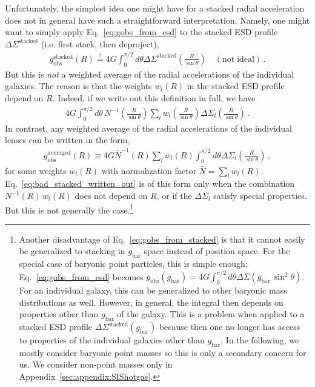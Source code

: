 \documentclass[a4paper,11pt]{article}
\begin{document}
Unfortunately, the simplest idea one might have for a stacked radial acceleration does not  in general have such a straightforward interpretation.
Namely, one might want to simply apply Eq.~\eqref{eq:gobs_from_esd} to the stacked ESD profile $\Delta \Sigma^{\mathrm{stacked}}$ (i.e. first stack, then deproject),
\begin{align}
 \label{eq:gobs_from_stacked}
 g_{\mathrm{obs}}^{\mathrm{stacked}}(R) \stackrel{?}{=} 4G \int_0^{\pi/2} d \theta \Delta \Sigma^{\mathrm{stacked}}\left(\frac{R}{\sin \theta}\right) \quad (\mathrm{not\;ideal}) \,.
\end{align}
But  this is \emph{not} a weighted average of the radial accelerations of the individual galaxies.
The reason is that the weights $w_l(R)$ in the stacked ESD profile depend on $R$.
Indeed, if we write out this definition in full, we have
\begin{align}
\label{eq:bad_stacked_written_out}
4G \int_0^{\pi/2} d\theta \, N^{-1}\left(\frac{R}{\sin \theta}\right) \sum_l w_l\left(\frac{R}{\sin \theta}\right) \Delta \Sigma_l\left(\frac{R}{\sin \theta}\right) \,.
\end{align}
In contrast, any weighted average of the radial accelerations of the individual lenses can be written in the form,
\begin{align}
\label{eq:good_stacked_general}
 g_{\mathrm{obs}}^{\mathrm{averaged}}(R) \equiv 4G \bar{N}^{-1}(R) \sum_l \bar{w}_l(R) \int_0^{\pi/2} d\theta \Delta \Sigma_l\left(\frac{R}{\sin \theta}\right) \,,
\end{align}
for some weights $\bar{w}_l(R)$ with normalization factor $\bar{N} = \sum_l \bar{w}_l(R)$.
Eq.~\eqref{eq:bad_stacked_written_out} is of this form only when the combination $N^{-1}(R) \, w_l(R)$ does not depend on $R$, or if the $\Delta \Sigma_l$ satisfy special properties.
But this is not generally the case.\footnote{
  Another disadvantage of Eq.~\eqref{eq:gobs_from_stacked} is that it cannot easily be generalized to stacking in $g_{\mathrm{bar}}$ space instead of position space.
  For the special case of baryonic point particles, this is simple enough; Eq.~\eqref{eq:gobs_from_esd} becomes $g_{\mathrm{obs}}(g_{\mathrm{bar}}) = 4G \int_0^{\pi/2} d\theta \Delta \Sigma(g_{\mathrm{bar}} \, \sin^2 \theta)$.
  For an individual galaxy, this can be generalized to other baryonic mass distributions as well.
  However, in general, the integral then depends on properties other than $g_{\mathrm{bar}}$ of the galaxy.
  This is a problem when applied to a stacked ESD profile $\Delta \Sigma^{\mathrm{stacked}}(g_{\mathrm{bar}})$ because then one no longer has access to properties of the individual galaxies other than $g_{\mathrm{bar}}$.
  In the following, we mostly consider baryonic point masses so this is only a secondary concern for us.
  We consider non-point masses only in Appendix~\ref{sec:appendix:SIShotgas}.
}
\end{document}
